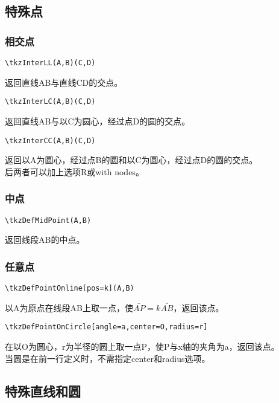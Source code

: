 \documentclass[UTF8]{ctexart}
\begin{document}
\subsection{特殊点}
\subsubsection{相交点}
\begin{lstlisting}
\tkzInterLL(A,B)(C,D)
\end{lstlisting}
返回直线AB与直线CD的交点。
\begin{lstlisting}
\tkzInterLC(A,B)(C,D)
\end{lstlisting}
返回直线AB与以C为圆心，经过点D的圆的交点。
\begin{lstlisting}
\tkzInterCC(A,B)(C,D)
\end{lstlisting}
返回以A为圆心，经过点B的圆和以C为圆心，经过点D的圆的交点。\\
后两者可以加上选项R或with nodes。
\subsubsection{中点}
\begin{lstlisting}
\tkzDefMidPoint(A,B)
\end{lstlisting}
返回线段AB的中点。
\subsubsection{任意点}
\begin{lstlisting}
\tkzDefPointOnline[pos=k](A,B)
\end{lstlisting}
以A为原点在线段AB上取一点，使$\bar{AP}=k\bar{AB}$，返回该点。
\begin{lstlisting}
\tkzDefPointOnCircle[angle=a,center=O,radius=r]
\end{lstlisting}
在以O为圆心，r为半径的圆上取一点P，使P与x轴的夹角为a，返回该点。\\
当圆是在前一行定义时，不需指定center和radius选项。
\subsection{特殊直线和圆}
\end{document}
